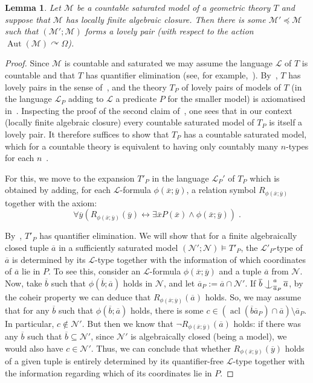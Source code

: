 \documentclass{article}
\newtheorem{lemma}[theorem]{Lemma}
\theoremstyle{remark}
\theoremstyle{definition}
\def\acts{\curvearrowright}
\DeclareMathOperator{\acl}{acl}
\DeclareMathOperator{\Aut}{Aut}
\def\a{\overline{a}}
\def\b{\overline{b}}
\newcommand{\M}[0]{\mathcal{M}}
\def\Ind#1#2{#1\setbox0=\hbox{$#1x$}\kern\wd0\hbox to 0pt{\hss$#1\mid$\hss}
	\lower.9\ht0\hbox to 0pt{\hss$#1\smile$\hss}\kern\wd0}
\def\ind{\mathop{\mathpalette\Ind{}}}
\begin{document}
{{{{{\begin{lemma}\label{lem: lovely correspondence} Let $\M$ be a countable saturated model of a geometric theory $T$ and suppose that $\M$ has locally finite algebraic closure. Then there is some $\M'\preceq\M$ such that $(\M'; \M)$ forms a lovely pair (with respect to the action $\Aut(\M)\acts \Omega$).
\end{lemma}
\begin{proof} Since $\M$ is countable and saturated we may assume the language $\mathcal{L}$ of $T$ is countable {and that $T$ has quantifier elimination (see, for example,~\cite[Lemma 2.6]{pech2018reconstructing}}). By~\cite{berenstein2010lovely}, $T$ has lovely pairs in the sense of~\cite[Definition 2.3]{berenstein2010lovely}, and the theory $T_P$ of lovely pairs of models of $T$  (in the language $\mathcal{L}_P$ adding to $\mathcal{L}$ a predicate $P$ for the smaller model) is  axiomatised in~\cite[Theorem 2.10]{berenstein2010lovely}. Inspecting the proof of the second claim of~\cite[Theorem 2.10]{berenstein2010lovely}, one sees that in our context (locally finite algebraic closure) every countable saturated model of $T_P$ is itself a lovely pair. {It therefore suffices to show that  $T_P$ has a countable saturated model, which for a countable theory is  equivalent to having only countably many $n$-types for each  $n$~\cite[Lemma~4.3.9]{tent2012course}.}%

For this, we move to the expansion $T'_P$ in the language $\mathcal{L}_P'$ of $T_P$ which is obtained by adding, for each $\mathcal{L}$-formula $\phi(\overline{x}; \overline{y})$, a relation symbol $R_{\phi(\overline{x}; \overline{y})}$ together with the axiom:
\[\forall \overline{y}\left( R_{\phi(\overline{x}; \overline{y})}(\overline{y})\leftrightarrow \exists \overline{x} P(\overline{x})\wedge \phi(\overline{x}; \overline{y})\right)\;.\]
{By~\cite[Corollary~3.2]{berenstein2010lovely},
  $T'_P$ has quantifier elimination. 
  {We will show that} for a finite algebraically
  closed tuple $\overline{a}$ in a sufficiently saturated model
  $(\mathcal{N}'; \mathcal{N}) \models T'_P$, the $\mathcal{L}'_P$-type of
  $\overline{a}$ is determined by its $\mathcal{L}$-type together with the information of which coordinates of $\overline{a}$ lie in $P$. {To see this, consider an $\mathcal{L}$-formula $\phi(\overline{x};\overline{y})$ and a tuple $\a$ from $\mathcal{N}$. Now, take $\b$ such that $\phi(\b; \a)$ holds in $\mathcal{N}$, and let $\a_P:=\a\cap\mathcal{N}'$. If $\b\ind^a_{\a_P}\a$, by the coheir property we can deduce that $R_{\phi(\overline{x};\overline{y})}(\a)$ holds. So, we may assume that for any $\b$ such that $\phi(\b; \a)$ holds, there is some $c\in(\acl(\b\a_P)\cap\a)\setminus\a_P$. In particular, $c\not\in\mathcal{N}'$. But then we know that $\neg R_{\phi(\overline{x};\overline{y})}(\a)$ holds: if there was any $\b$ such that $\b\subseteq \mathcal{N}'$, since $\mathcal{N}'$ is algebraically closed (being a model), we would also have $c\in\mathcal{N}'$. Thus, we can conclude that whether $R_{\phi(\overline{x}; \overline{y})}(\overline{y})$ holds of a given tuple is entirely determined by its quantifier-free $\mathcal{L}$-type together with the information regarding which of its coordinates lie in $P$.} 
  
}
\end{proof}}}}}}
\end{document}
